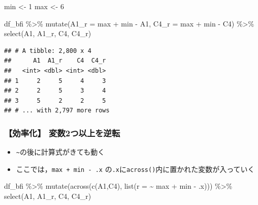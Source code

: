\documentclass[
  xelatex,ja=standard, b5paper]{bxjsbook}
\newenvironment{Shaded}{\begin{snugshade}}{\end{snugshade}}
\newcommand{\AttributeTok}[1]{\textcolor[rgb]{0.77,0.63,0.00}{#1}}
\newcommand{\DecValTok}[1]{\textcolor[rgb]{0.00,0.00,0.81}{#1}}
\newcommand{\FunctionTok}[1]{\textcolor[rgb]{0.00,0.00,0.00}{#1}}
\newcommand{\NormalTok}[1]{#1}
\newcommand{\OtherTok}[1]{\textcolor[rgb]{0.56,0.35,0.01}{#1}}
\newcommand{\SpecialCharTok}[1]{\textcolor[rgb]{0.00,0.00,0.00}{#1}}
\providecommand{\tightlist}{%
  \setlength{\itemsep}{0pt}\setlength{\parskip}{0pt}}
\begin{document}
\begin{Shaded}
\begin{Highlighting}[]
\NormalTok{min }\OtherTok{\textless{}{-}} \DecValTok{1}
\NormalTok{max }\OtherTok{\textless{}{-}} \DecValTok{6}

\NormalTok{df\_bfi }\SpecialCharTok{\%\textgreater{}\%} 
  \FunctionTok{mutate}\NormalTok{(}\AttributeTok{A1\_r =}\NormalTok{ max }\SpecialCharTok{+}\NormalTok{ min }\SpecialCharTok{{-}}\NormalTok{ A1,}
         \AttributeTok{C4\_r =}\NormalTok{ max }\SpecialCharTok{+}\NormalTok{ min }\SpecialCharTok{{-}}\NormalTok{ C4) }\SpecialCharTok{\%\textgreater{}\%} 
  \FunctionTok{select}\NormalTok{(A1, A1\_r, C4, C4\_r)}
\end{Highlighting}
\end{Shaded}

\begin{verbatim}
## # A tibble: 2,800 x 4
##      A1  A1_r    C4  C4_r
##   <int> <dbl> <int> <dbl>
## 1     2     5     4     3
## 2     2     5     3     4
## 3     5     2     2     5
## # ... with 2,797 more rows
\end{verbatim}

\hypertarget{mu-rev-rule1}{%
\subsubsection{【効率化】 変数2つ以上を逆転}\label{mu-rev-rule1}}

\begin{itemize}
\tightlist
\item
  \texttt{\textasciitilde{}}の後に計算式がきても動く
\item
  ここでは，\texttt{max\ +\ min\ -\ .x} の\texttt{.x}に\texttt{across()}内に置かれた変数が入っていく
\end{itemize}

\begin{Shaded}
\begin{Highlighting}[]
\NormalTok{df\_bfi }\SpecialCharTok{\%\textgreater{}\%} 
  \FunctionTok{mutate}\NormalTok{(}\FunctionTok{across}\NormalTok{(}\FunctionTok{c}\NormalTok{(A1,C4),}
                \FunctionTok{list}\NormalTok{(}\AttributeTok{r =} \SpecialCharTok{\textasciitilde{}}\NormalTok{ max }\SpecialCharTok{+}\NormalTok{ min }\SpecialCharTok{{-}}\NormalTok{ .x))) }\SpecialCharTok{\%\textgreater{}\%} 
  \FunctionTok{select}\NormalTok{(A1, A1\_r, C4, C4\_r)}
\end{Highlighting}
\end{Shaded}
\end{document}
